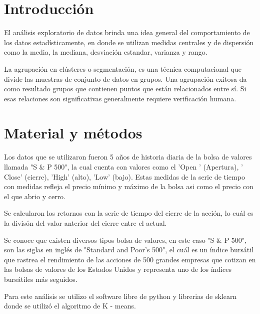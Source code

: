 \documentclass[5p,times,authoryear]{elsarticle}
\begin{document}

\section{Introducci\'on}

El an\'alisis exploratorio de datos brinda una idea general del comportamiento de los datos estad\'isticamente, en donde se utilizan medidas centrales y de dispersi\'on como la media, la mediana, desviaci\'on estandar, varianza y rango.


La agrupaci\'on en cl\'usteres o segmentaci\'on, es una t\'ecnica computacional que divide las muestras de conjunto de datos en grupos. Una agrupaci\'on exitosa da como resultado grupos que contienen puntos que est\'an relacionados entre s\'i. Si esas relaciones son significativas generalmente requiere verificaci\'on humana.



\section{Material y m\'etodos}
Los datos que se utilizaron fueron 5 a\~{n}os de historia diaria de la bolsa de valores llamada "S \& P 500", la cual cuenta con valores como el 'Open '  (Apertura), ' Close' (cierre), 'High' (alto), 'Low' (bajo). Estas medidas de la serie de tiempo con medidas  refleja el precio m\'inimo y m\'aximo de la bolsa asi como el precio con el que abrio y cerro. 

Se calcularon los retornos con la serie de tiempo del cierre de la acción, lo cu\'al es la divisón del valor anterior del cierre entre el actual.

Se conoce que existen diversos tipos bolsa de valores, en este caso "S $\&$ P 500", son las siglas en ingl\'es de "Standard and Poor's 500", el cu\'al es un \'indice burs\'atil que rastrea el rendimiento de las acciones de 500 grandes empresas que cotizan en las bolsas de valores de los Estados Unidos y representa uno de los \'indices burs\'atiles m\'as seguidos.

Para este an\'alisis se utilizo el software libre de python y librerias de sklearn donde se utiliz\'o el algoritmo de K - means.

\end{document}
